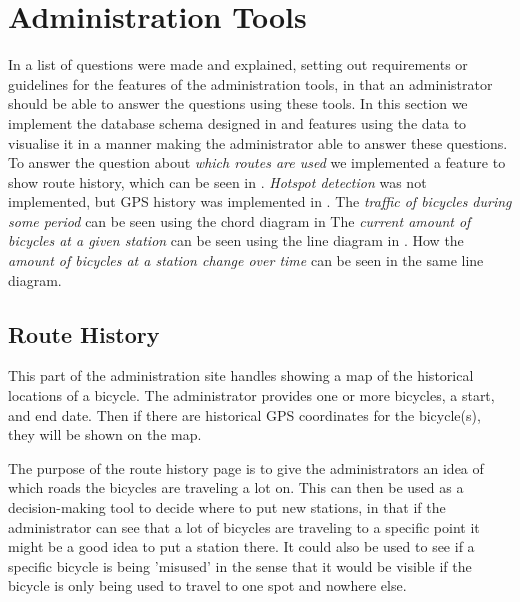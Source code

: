 \section{Administration Tools}\label{sec:impAdminTools}
In  a list of questions were made and explained, setting out requirements or guidelines for the features of the administration tools, in that an administrator should be able to answer the questions using these tools. 
In this section we implement the database schema designed in  and features using the data to visualise it in a manner making the administrator able to answer these questions.
To answer the question about \textit{which routes are used} we implemented a feature to show route history, which can be seen in .
\textit{Hotspot detection} was not implemented, but GPS history was implemented in .
The \textit{traffic of bicycles during some period} can be seen using the chord diagram in 
The \textit{current amount of bicycles at a given station} can be seen using the line diagram in .
How the \textit{amount of bicycles at a station change over time} can be seen in the same line diagram.

\subsection{Route History}\label{sec:routeHistory}
This part of the administration site handles showing a map of the historical locations of a bicycle.
The administrator provides one or more bicycles, a start, and end date.
Then if there are historical GPS coordinates for the bicycle(s), they will be shown on the map. 

The purpose of the route history page is to give the administrators an idea of which roads the bicycles are traveling a lot on. 
This can then be used as a decision-making tool to decide where to put new stations, in that if the administrator can see that a lot of bicycles are traveling to a specific point it might be a good idea to put a station there.
It could also be used to see if a specific bicycle is being 'misused' in the sense that it would be visible if the bicycle is only being used to travel to one spot and nowhere else.

